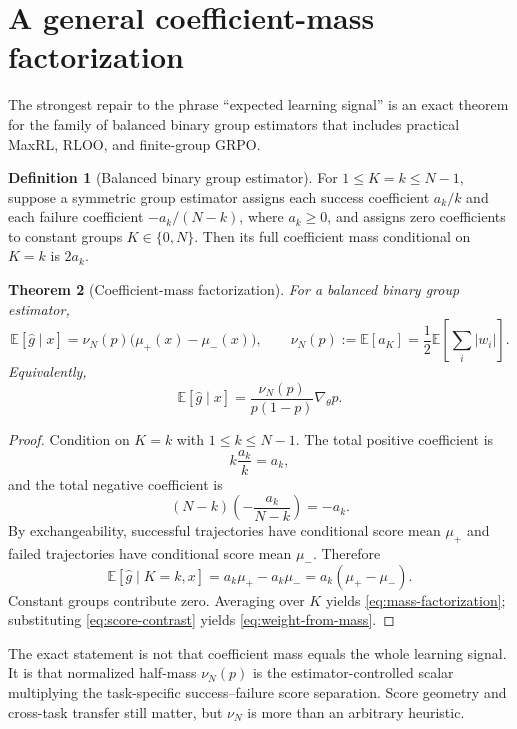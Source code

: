 \documentclass[11pt]{article}
\newcommand{\E}{\mathbb{E}}
\newcommand{\grad}{\nabla_{\!\theta}}
\newtheorem{theorem}{Theorem}[section]
\theoremstyle{definition}
\newtheorem{definition}[theorem]{Definition}
\theoremstyle{remark}
\begin{document}
\section{A general coefficient-mass factorization}
\label{sec:factorization}

The strongest repair to the phrase ``expected learning signal'' is an exact theorem for the family of balanced binary group estimators that includes practical MaxRL, RLOO, and finite-group GRPO.

\begin{definition}[Balanced binary group estimator]
For $1\le K=k\le N-1$, suppose a symmetric group estimator assigns each success coefficient $a_k/k$ and each failure coefficient $-a_k/(N-k)$, where $a_k\ge0$, and assigns zero coefficients to constant groups $K\in\{0,N\}$. Then its full coefficient mass conditional on $K=k$ is $2a_k$.
\end{definition}

\begin{theorem}[Coefficient-mass factorization]
\label{thm:factorization}
For a balanced binary group estimator,
\begin{equation}
\E[\widehat g\mid x]
=\nu_N(p)\bigl(\mu_+(x)-\mu_-(x)\bigr),
\qquad
\nu_N(p):=\E[a_K]
=\frac12\E\left[\sum_i|w_i|\right].
\label{eq:mass-factorization}
\end{equation}
Equivalently,
\begin{equation}
\E[\widehat g\mid x]
=\frac{\nu_N(p)}{p(1-p)}\grad p.
\label{eq:weight-from-mass}
\end{equation}
\end{theorem}

\begin{proof}
Condition on $K=k$ with $1\le k\le N-1$. The total positive coefficient is
\[
k\frac{a_k}{k}=a_k,
\]
and the total negative coefficient is
\[
(N-k)\left(-\frac{a_k}{N-k}\right)=-a_k.
\]
By exchangeability, successful trajectories have conditional score mean $\mu_+$ and failed trajectories have conditional score mean $\mu_-$. Therefore
\[
\E[\widehat g\mid K=k,x]
=a_k\mu_+-a_k\mu_-
=a_k(\mu_+-\mu_-).
\]
Constant groups contribute zero. Averaging over $K$ yields \cref{eq:mass-factorization}; substituting \cref{eq:score-contrast} yields \cref{eq:weight-from-mass}.
\end{proof}

\begin{takeawaybox}
The exact statement is not that coefficient mass equals the whole learning signal. It is that normalized half-mass $\nu_N(p)$ is the estimator-controlled scalar multiplying the task-specific success--failure score separation. Score geometry and cross-task transfer still matter, but $\nu_N$ is more than an arbitrary heuristic.
\end{takeawaybox}
\end{document}
